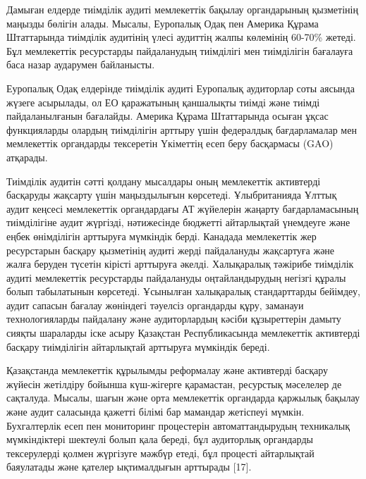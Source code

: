 
Дамыған елдерде тиімділік аудиті мемлекеттік бақылау органдарының
қызметінің маңызды бөлігін алады. Мысалы, Еуропалық Одақ пен Америка
Құрама Штаттарында тиімділік аудитінің үлесі аудиттің жалпы көлемінің
60-70\% жетеді. Бұл мемлекеттік ресурстарды пайдаланудың тиімділігі мен
тиімділігін бағалауға баса назар аударумен байланысты.

Еуропалық Одақ елдерінде тиімділік аудиті Еуропалық аудиторлар соты
аясында жүзеге асырылады, ол ЕО қаражатының қаншалықты тиімді және
тиімді пайдаланылғанын бағалайды. Америка Құрама Штаттарында осыған
ұқсас функцияларды олардың тиімділігін арттыру үшін федералдық
бағдарламалар мен мемлекеттік органдарды тексеретін Үкіметтің есеп беру
басқармасы (GAO) атқарады.

Тиімділік аудитін сәтті қолдану мысалдары оның мемлекеттік активтерді
басқаруды жақсарту үшін маңыздылығын көрсетеді. Ұлыбританияда Ұлттық
аудит кеңсесі мемлекеттік органдардағы АТ жүйелерін жаңарту
бағдарламасының тиімділігіне аудит жүргізді, нәтижесінде бюджетті
айтарлықтай үнемдеуге және еңбек өнімділігін арттыруға мүмкіндік берді.
Канадада мемлекеттік жер ресурстарын басқару қызметінің аудиті жерді
пайдалануды жақсартуға және жалға беруден түсетін кірісті арттыруға
әкелді. Халықаралық тәжірибе тиімділік аудиті мемлекеттік ресурстарды
пайдалануды оңтайландырудың негізгі құралы болып табылатынын көрсетеді.
Ұсынылған халықаралық стандарттарды бейімдеу, аудит сапасын бағалау
жөніндегі тәуелсіз органдарды құру, заманауи технологияларды пайдалану
және аудиторлардың кәсіби құзыреттерін дамыту сияқты шараларды іске
асыру Қазақстан Республикасында мемлекеттік активтерді басқару
тиімділігін айтарлықтай арттыруға мүмкіндік береді.

Қазақстанда мемлекеттік құрылымды реформалау және активтерді басқару
жүйесін жетілдіру бойынша күш-жігерге қарамастан, ресурстық мәселелер де
сақталуда. Мысалы, шағын және орта мемлекеттік органдарда қаржылық
бақылау және аудит саласында қажетті білімі бар мамандар жетіспеуі
мүмкін. Бухгалтерлік есеп пен мониторинг процестерін автоматтандырудың
техникалық мүмкіндіктері шектеулі болып қала береді, бұл аудиторлық
органдарды тексерулерді қолмен жүргізуге мәжбүр етеді, бұл процесті
айтарлықтай баяулатады және қателер ықтималдығын арттырады {[}17{]}.

